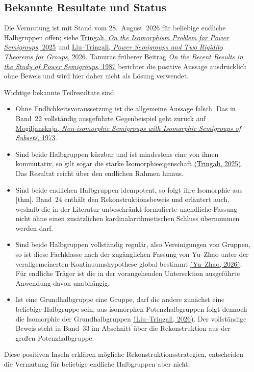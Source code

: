 \documentclass[main.tex]{subfiles}
\begin{document}
\subsection{Bekannte Resultate und Status}

\begin{remark}
Die Vermutung ist mit Stand vom 28.~August~2026 für beliebige endliche
Halbgruppen offen; siehe
\href{https://doi.org/10.1007/978-3-031-75326-8_20}%
  {Tringali, \emph{On the Isomorphism Problem for Power Semigroups}, 2025}
und
\href{https://doi.org/10.48550/arXiv.2606.01917}%
  {Liu--Tringali, \emph{Power Semigroups and Two Rigidity Theorems for
  Groups}, 2026}.
Tamuras früherer Beitrag
\href{https://doi.org/10.1007/978-94-009-3839-7_22}%
  {\emph{On the Recent Results in the Study of Power Semigroups}, 1987}
berichtet die positive Aussage ausdrücklich ohne Beweis und wird hier daher
nicht als Lösung verwendet.

Wichtige bekannte Teilresultate sind:
\begin{itemize}
  \item Ohne Endlichkeitsvoraussetzung ist die allgemeine Aussage falsch.
    Das in Band~22 vollständig ausgeführte Gegenbeispiel geht zurück auf
    \href{https://doi.org/10.1007/BF02389140}%
      {Mogiljanskaja, \emph{Non-isomorphic Semigroups with Isomorphic
      Semigroups of Subsets}, 1973}.
  \item Sind beide Halbgruppen kürzbar und ist mindestens eine von ihnen
    kommutativ, so gilt sogar die starke Isomorphieeigenschaft
    \href{https://doi.org/10.1007/978-3-031-75326-8_20}%
      {(Tringali, 2025)}.  Das Resultat reicht über den endlichen Rahmen
      hinaus.
  \item Sind beide endlichen Halbgruppen idempotent, so folgt ihre
    Isomorphie aus
    [thm].
    Band~24 enthält den Rekonstruktionsbeweis und erläutert auch, weshalb
    die in der Literatur unbeschränkt formulierte unendliche Fassung nicht
    ohne einen zusätzlichen kardinalarithmetischen Schluss übernommen
    werden darf.
  \item Sind beide Halbgruppen vollständig regulär, also Vereinigungen von
    Gruppen, so ist diese Fachklasse nach der zugänglichen Fassung von
    Yu--Zhao unter der verallgemeinerten Kontinuumshypothese global bestimmt
    \href{https://doi.org/10.1080/00927872.2026.2659846}%
      {(Yu--Zhao, 2026)}.  Für endliche Träger ist die in der vorangehenden
      Untersektion ausgeführte Anwendung davon unabhängig.
  \item Ist eine Grundhalbgruppe eine Gruppe, darf die andere zunächst eine
    beliebige Halbgruppe sein; aus isomorphen Potenzhalbgruppen folgt
    dennoch die Isomorphie der Grundhalbgruppen
    \href{https://doi.org/10.48550/arXiv.2606.01917}%
      {(Liu--Tringali, 2026)}.  Der vollständige Beweis steht in Band~33 im
      Abschnitt über die Rekonstruktion aus der großen Potenzhalbgruppe.
\end{itemize}
Diese positiven Inseln erklären mögliche Rekonstruktionsstrategien, entscheiden
die Vermutung für beliebige endliche Halbgruppen aber nicht.
\end{remark}
\end{document}

